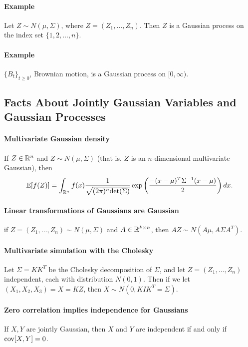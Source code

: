 \documentclass[../../../Master/AppliedStochastics.tex]{subfiles}
\begin{document}
\paragraph{Example} Let $Z\sim N(\mu, \Sigma)$, where $Z=(Z_1,\dots,Z_n)$.  Then $Z$ is a Gaussian process on the index set $\{1,2,\dots,n\}$.

\paragraph{Example} $\{B_t\}_{t\geq 0}$, Brownian motion, is a Gaussian process on $[0,\infty)$.


\subsection{Facts About Jointly Gaussian Variables and Gaussian Processes}

\paragraph{Multivariate Gaussian density}
    If $Z\in\mathbb{R}^n$ and $Z\sim N(\mu,\Sigma)$ (that is, $Z$ is an $n$-dimensional multivariate Gaussian), then 
        $$\begin{aligned}
            \mathbb{E}[f(Z)]=\int_{\mathbb{R}^n}f(x)\dfrac{1}{\sqrt{(2\pi)^n\mathrm{det}(\Sigma)}}\exp\left(\dfrac{-(x-\mu)^T\Sigma^{-1}(x-\mu)}{2}\right)dx.
        \end{aligned}$$

\paragraph{Linear transformations of Gaussians are Gaussian}
        if $Z=(Z_1,\dots,Z_n)\sim N(\mu,\Sigma)$ and $A\in\mathbb{R}^{k\times n}$, then $AZ\sim N(A\mu, A\Sigma A^T)$.

\paragraph{Multivariate simulation with the Cholesky} 
Let $\Sigma= KK^T$ be the Cholesky decomposition of $\Sigma$, 
    and let $Z=(Z_1,\dots,Z_n)$ independent, each with distribution $N(0,1)$.  
    Then if we let $(X_1,X_2,X_3)=X=KZ$, then $X\sim N(0,KIK^T=\Sigma)$.

\paragraph{Zero correlation implies independence for Gaussians} 
    If $X,Y$ are jointly Gaussian, then $X$ and $Y$ are independent if and only if $\operatorname{cov}[X,Y]=0$.
\end{document}
